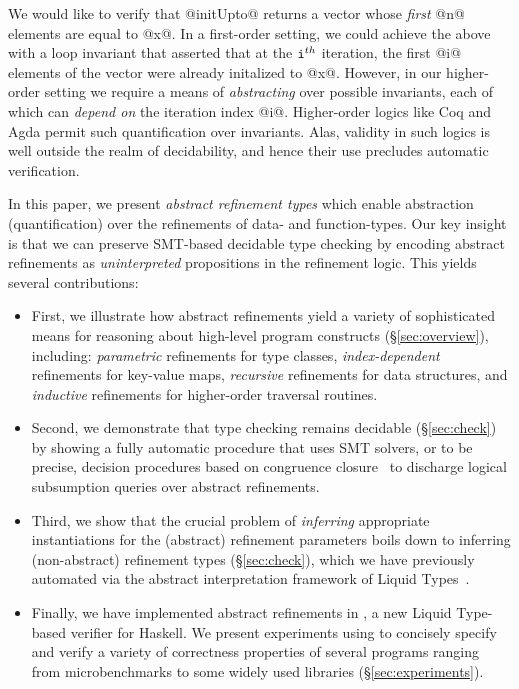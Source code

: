 We would like to 
verify that @initUpto@ returns a vector whose \emph{first}
@n@ elements are equal to @x@. 
In a first-order setting, we could achieve the above with 
a loop invariant that asserted that at the $\texttt{i}^{th}$
iteration, the first @i@ elements of the vector were 
already initalized to @x@. 
%
However, in our higher-order setting we require a means 
of \emph{abstracting} over possible invariants, each of which can
\emph{depend on} the iteration index @i@. 
%
Higher-order logics like Coq and Agda permit such quantification 
over invariants. Alas, validity in such logics is well outside the 
realm of decidability, and hence their use precludes automatic 
verification. %

In this paper, we present \emph{abstract refinement types} 
which enable abstraction (quantification) over the refinements 
of data- and function-types. Our key insight is that we can 
preserve SMT-based decidable type checking by encoding 
abstract refinements as \emph{uninterpreted} propositions 
in the refinement logic. 
This yields several contributions:
\begin{itemize}
\item First, we illustrate how abstract refinements yield a variety 
of sophisticated means for reasoning about high-level program 
constructs (\S \ref{sec:overview}), including:
\emph{parametric} refinements for type classes,
\emph{index-dependent} refinements for key-value maps,
\emph{recursive} refinements for data structures, and
\emph{inductive} refinements for higher-order traversal routines.

\item Second, we demonstrate that type checking remains 
decidable (\S \ref{sec:check}) by showing a fully automatic
procedure that uses SMT solvers, or to be precise, 
decision procedures based on congruence closure~\cite{Nelson81}
to discharge logical subsumption queries over abstract refinements.

\item Third, we show that the crucial problem of \emph{inferring}
appropriate instantiations for the (abstract) refinement 
parameters boils down to inferring (non-abstract) refinement
types (\S \ref{sec:check}), which we have previously automated 
via the abstract interpretation framework of Liquid Types~\cite{LiquidPLDI08}. 

\item Finally, we have implemented abstract refinements in \toolname, 
a new Liquid Type-based verifier for Haskell. We present 
experiments using \toolname to concisely specify and 
verify a variety of correctness properties of several 
programs ranging from microbenchmarks to some widely 
used libraries (\S \ref{sec:experiments}).
\end{itemize}
